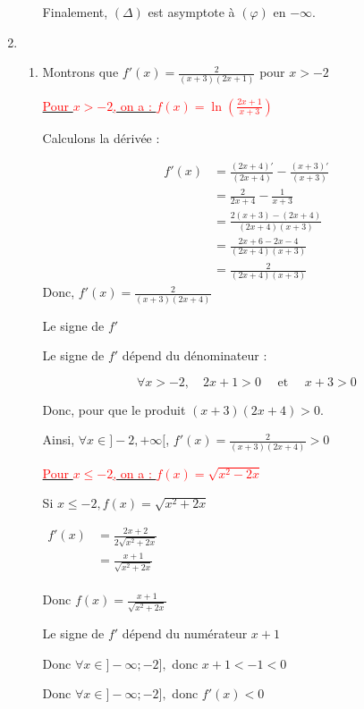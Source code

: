 \documentclass[12pt,a4paper]{article}
\begin{document}
\begin{enumerate}
\begin{enumerate}
Finalement, \( (\Delta) \) est asymptote à \( (\varphi) \) en \( -\infty \).

\end{enumerate}
\item
\begin{enumerate}
    \item  Montrons que \( f'(x) = \frac{2}{(x+3)(2x+1)} \) pour \( x > -2 \)

\underline{\textcolor{red}{Pour \( x > -2 \), on a : \( f(x) = \ln \left( \frac{2x+1}{x+3} \right) \)}}

Calculons la dérivée :

\begin{align*}
    f'(x) &= \frac{(2x+4)'}{(2x+4)} - \frac{(x+3)'}{(x+3)} \\
          &= \frac{2}{2x+4} - \frac{1}{x+3} \\
          &= \frac{2(x+3) - (2x+4)}{(2x+4)(x+3)} \\
          &= \frac{2x+6 - 2x - 4}{(2x+4)(x+3)} \\
          &= \frac{2}{(2x+4)(x+3)}
\end{align*}
Donc, \( f'(x) = \frac{2}{(x+3)(2x+4)} \)

Le signe de \( f' \)

Le signe de \( f' \) dépend du dénominateur :

\[
\forall x > -2, \quad 2x+1 > 0 \quad \text{ et } \quad x+3 > 0
\]

Donc, pour que le produit \((x+3)(2x+4) > 0\).

Ainsi, \( \forall x \in ]-2, +\infty[ \), \( f'(x) = \frac{2}{(x+3)(2x+4)} > 0 \)

\underline{\textcolor{red}{Pour \( x \leq -2 \), on a : \( f(x) = \sqrt{x^{2}-2x}\) }}

Si \( x \leq -2, f(x) = \sqrt{ x^{2} + 2x } \)

\(
\begin{aligned}
f'(x) &= \frac{2x+2}{2\sqrt{ x^{2} + 2x }}\\
      &= \frac{x+1}{\sqrt{ x^{2} + 2x }}\\ 
\end{aligned}
\)

\( \text{Donc } f(x)=\frac{x+1}{\sqrt{ x^{2} + 2x }}\)

Le signe de \(f'\) dépend du numérateur \( x+1 \)

Donc \( \forall x \in ]-\infty;-2], \) donc \( x+1 < -1 < 0 \)

Donc \( \forall x \in ]-\infty;-2], \) donc \( f'(x)< 0 \)


\end{enumerate}
\end{enumerate}
\end{document}

